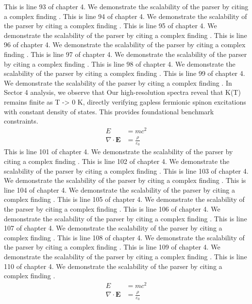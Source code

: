 This is line 93 of chapter 4. We demonstrate the scalability of the parser by citing a complex finding \cite{ref4_93}.
This is line 94 of chapter 4. We demonstrate the scalability of the parser by citing a complex finding \cite{ref4_94}.
This is line 95 of chapter 4. We demonstrate the scalability of the parser by citing a complex finding \cite{ref4_95}.
This is line 96 of chapter 4. We demonstrate the scalability of the parser by citing a complex finding \cite{ref4_96}.
This is line 97 of chapter 4. We demonstrate the scalability of the parser by citing a complex finding \cite{ref4_97}.
This is line 98 of chapter 4. We demonstrate the scalability of the parser by citing a complex finding \cite{ref4_98}.
This is line 99 of chapter 4. We demonstrate the scalability of the parser by citing a complex finding \cite{ref4_99}.
In Sector 4 analysis, we observe that Our high-resolution spectra reveal that K(T) remains finite as T -> 0 K, directly verifying gapless fermionic spinon excitations with constant density of states. This provides foundational benchmark constraints.
\begin{align*}
  E &= mc^2 \\
  \nabla \cdot \mathbf{E} &= \frac{\rho}{\varepsilon_0}
\end{align*}
This is line 101 of chapter 4. We demonstrate the scalability of the parser by citing a complex finding \cite{ref4_101}.
This is line 102 of chapter 4. We demonstrate the scalability of the parser by citing a complex finding \cite{ref4_102}.
This is line 103 of chapter 4. We demonstrate the scalability of the parser by citing a complex finding \cite{ref4_103}.
This is line 104 of chapter 4. We demonstrate the scalability of the parser by citing a complex finding \cite{ref4_104}.
This is line 105 of chapter 4. We demonstrate the scalability of the parser by citing a complex finding \cite{ref4_105}.
This is line 106 of chapter 4. We demonstrate the scalability of the parser by citing a complex finding \cite{ref4_106}.
This is line 107 of chapter 4. We demonstrate the scalability of the parser by citing a complex finding \cite{ref4_107}.
This is line 108 of chapter 4. We demonstrate the scalability of the parser by citing a complex finding \cite{ref4_108}.
This is line 109 of chapter 4. We demonstrate the scalability of the parser by citing a complex finding \cite{ref4_109}.
This is line 110 of chapter 4. We demonstrate the scalability of the parser by citing a complex finding \cite{ref4_110}.
\begin{align*}
  E &= mc^2 \\
  \nabla \cdot \mathbf{E} &= \frac{\rho}{\varepsilon_0}
\end{align*}
